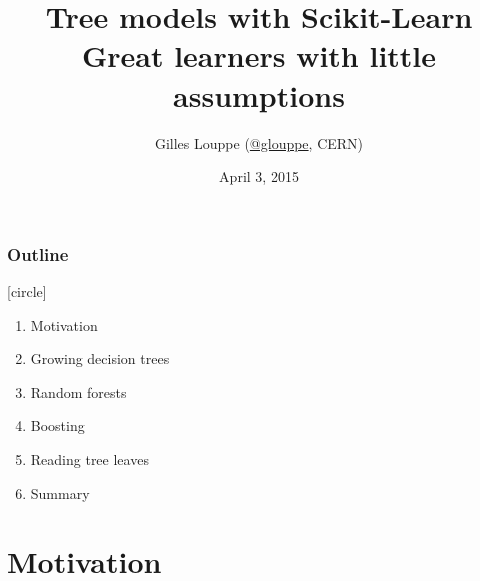 \documentclass{beamer}
\title{{\bf Tree models with Scikit-Learn}\\
Great learners with little assumptions}
\author{Gilles Louppe (\href{https://twitter.com/glouppe}{@glouppe}, CERN)}
\date{April 3, 2015}
\begin{document}
\begin{frame}
\titlepage
\end{frame}





\begin{frame}
  \frametitle{Outline}
  [circle]
  \begin{enumerate}
  \item Motivation

  \vspace{0.5cm}

  \item Growing decision trees

  \vspace{0.5cm}

  \item Random forests

    \vspace{0.5cm}

  \item Boosting

  \vspace{0.5cm}

  \item Reading tree leaves

  \vspace{0.5cm}

  \item Summary
  \end{enumerate}
\end{frame}



\section{Motivation}
\end{document}
